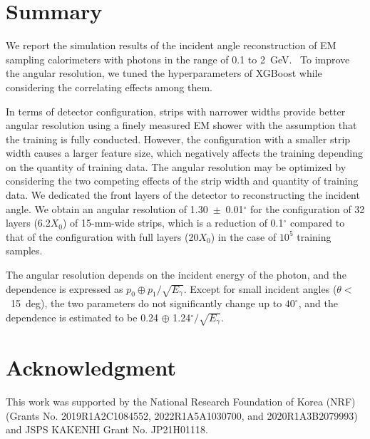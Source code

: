 \documentclass[preprint,12pt,times,a4paper]{elsarticle}
\begin{document}
\section{Summary}
\label{sec:sum}

We report the simulation results of the incident angle reconstruction of EM sampling calorimeters with photons in the range of 0.1 to 2~GeV. ~To improve the angular resolution, we tuned the hyperparameters of XGBoost while considering the correlating effects among them.

In terms of detector configuration, strips with narrower widths provide better angular resolution using a finely measured EM shower with the assumption that the training is fully conducted. However, the configuration with a smaller strip width causes a larger feature size, which negatively affects the training depending on the quantity of training data. The angular resolution may be optimized by considering the two competing effects of the strip width and quantity of training data. We dedicated the front layers of the detector to reconstructing the incident angle. We obtain an angular resolution of 1.30~$\pm$~0.01$^{\circ}$ for the configuration of 32 layers (6.2$X_{0}$) of 15-mm-wide strips, which is a reduction of 0.1$^{\circ}$ compared to that of the configuration with full layers (20$X_{0}$) in the case of $10^{5}$ training samples. 

The angular resolution depends on the incident energy of the photon, and the dependence is expressed as $p_{0} \oplus p_{1}/\sqrt{E_{\gamma}}$. Except for small incident angles ($\theta<$~15~deg), the two parameters do not significantly change up to 
$40^{\circ}$, and the dependence is estimated to be 0.24 $\oplus$ 1.24$^{\circ}/\sqrt{E_{\gamma}}$. 

\label{sec:con}



\section*{Acknowledgment}
This work was supported by the National Research Foundation of Korea (NRF) 
(Grants No. 2019R1A2C1084552, 2022R1A5A1030700, and 2020R1A3B2079993) and JSPS KAKENHI Grant No. JP21H01118.
\end{document}
